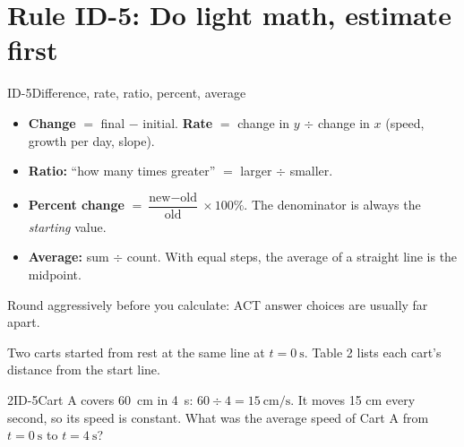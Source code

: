 \documentclass[11pt]{article}
\begin{document}
\section{Rule ID-5: Do light math, estimate first}

\begin{rulebox}{ID-5}{Difference, rate, ratio, percent, average}
\begin{itemize}
\item \textbf{Change} $=$ final $-$ initial. \textbf{Rate} $=$ change in $y$ $\div$ change in $x$ (speed, growth per day, slope).
\item \textbf{Ratio:} ``how many times greater'' $=$ larger $\div$ smaller.
\item \textbf{Percent change} $= \dfrac{\text{new}-\text{old}}{\text{old}}\times100\%$. The denominator is always the \emph{starting} value.
\item \textbf{Average:} sum $\div$ count. With equal steps, the average of a straight line is the midpoint.
\end{itemize}
Round aggressively before you calculate: ACT answer choices are usually far apart.
\end{rulebox}


Two carts started from rest at the same line at $t=\SI{0}{\second}$. Table 2 lists each cart's distance from the start line.

\passageend

\begin{q}{2}{ID-5}{Cart A covers \SI{60}{\centi\metre} in \SI{4}{\second}: $60\div4=\SI{15}{\centi\metre\per\second}$. It moves 15 cm every second, so its speed is constant.}
What was the average speed of Cart A from $t=\SI{0}{\second}$ to $t=\SI{4}{\second}$?
\end{q}
\end{document}
